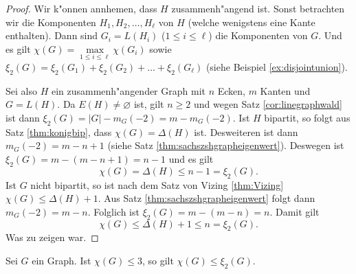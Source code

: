 \begin{proof}
  Wir k"onnen annhemen, dass $H$ zusammenh"angend ist. Sonst betrachten wir die Komponenten $H_1,H_2,\dots,H_\ell$ von $H$ (welche wenigstens eine Kante enthalten). Dann sind $G_i= L(H_i)$ ($1\leq i \leq \ell$) die Komponenten von $G$. Und es gilt $\chi(G) = \max\limits_{1 \leq i \leq \ell} \chi(G_i)$ sowie $\xi_{2}(G) = \xi_{2}(G_1) + \xi_{2}(G_2) + \dots + \xi_{2}(G_\ell)$ (siehe Beispiel \ref{ex:disjointunion}). 

Sei also $H$ ein zusammenh"angender Graph mit $n$ Ecken, $m$ Kanten und $G = L(H)$. Da $E(H) \neq \varnothing$ ist, gilt $n \geq 2$ und wegen Satz \ref{cor:linegraphwald} ist dann $\xi_{2}(G) = |G| - m_G(-2) = m - m_G(-2)$. Ist $H$ bipartit, so folgt aus Satz \ref{thm:konigbip}, dass $\chi(G) = \Delta(H)$ ist.  
  Desweiteren ist dann $m_G(-2) = m-n+1$ (siehe Satz \ref{thm:sachszshgrapheigenwert}). Deswegen ist $\xi_{2}(G) = m - (m-n+1) = n-1$ und es gilt
  $$\chi(G) = \Delta(H) \leq n-1  = \xi_{2}(G).$$
  Ist $G$ nicht bipartit, so ist nach dem Satz von Vizing \ref{thm:Vizing} $\chi(G) \leq \Delta(H) +1$. Aus Satz \ref{thm:sachszshgrapheigenwert} folgt dann $m_G(-2) = m-n$. Folglich ist $\xi_{2}(G) = m - (m-n) = n$. Damit gilt
  $$\chi(G) \leq \Delta(H) +1 \leq n = \xi_{2}(G).$$
  Was zu zeigen war.
\end{proof}
\begin{theorem}
  Sei $G$ ein Graph. Ist $\chi(G) \leq 3$, so gilt $\chi(G) \leq \xi_{2}(G)$.
  \label{thm:chiklein}
\end{theorem}

